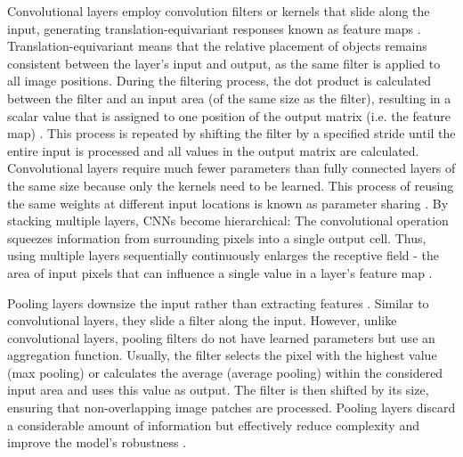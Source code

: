 Convolutional layers employ convolution filters or kernels that slide along the input, generating translation-equivariant  responses known as feature maps \cite{zhang_parallel_1990}.
Translation-equivariant means that the relative placement of objects remains consistent between the layer's input and output, as the same filter is applied to all image positions.
During the filtering process, the dot product is calculated between the filter and an input area (of the same size as the filter), resulting in a scalar value that is assigned to one position of the output matrix (i.e. the feature map) .
This process is repeated by shifting the filter by a specified stride until the entire input is processed and all values in the output matrix are calculated.
Convolutional layers require much fewer parameters than fully connected layers of the same size because only the kernels need to be learned.
This process of reusing the same weights at different input locations is known as parameter sharing .
By stacking multiple layers, CNNs become hierarchical: The convolutional operation squeezes information from surrounding pixels into a single output cell. Thus, using multiple layers sequentially continuously enlarges the receptive field - the area of input pixels that can influence a single value in a layer's feature map .

Pooling layers downsize the input rather than extracting features .
Similar to convolutional layers, they slide a filter along the input.
However, unlike convolutional layers, pooling filters do not have learned parameters but use an aggregation function.
Usually, the filter selects the pixel with the highest value (max pooling) or calculates the average (average pooling) within the considered input area and uses this value as output.
The filter is then shifted by its size, ensuring that non-overlapping image patches are processed.
Pooling layers discard a considerable amount of information but effectively reduce complexity and improve the model's robustness \cite{ciresan_flexible_2011}.

